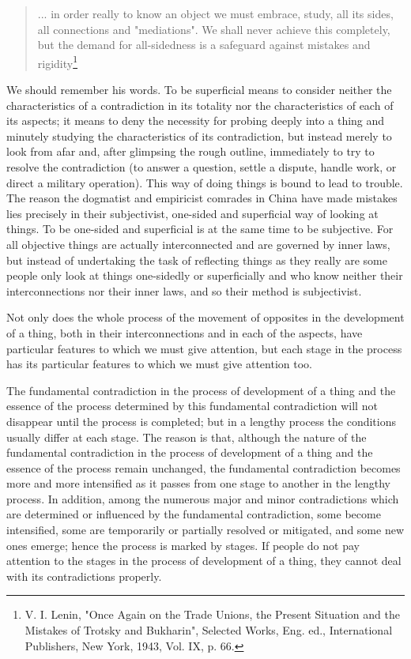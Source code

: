 \documentclass{article}
\begin{document}
\begin{quote}
... in order really to know an object we must embrace, study, all its sides,
all connections and "mediations". We shall never achieve this completely, but
the demand for all-sidedness is a safeguard against mistakes and
rigidity\footnote{V. I. Lenin, "Once Again on the Trade Unions, the Present
Situation and the Mistakes of Trotsky and Bukharin", Selected Works, Eng. ed.,
International Publishers, New York, 1943, Vol. IX, p. 66.}
\end{quote}

We should remember his words. To be superficial means to consider neither the
characteristics of a contradiction in its totality nor the characteristics of
each of its aspects; it means to deny the necessity for probing deeply into
a thing and minutely studying the characteristics of its contradiction, but
instead merely to look from afar and, after glimpsing the rough outline,
immediately to try to resolve the contradiction (to answer a question, settle
a dispute, handle work, or direct a military operation). This way of doing
things is bound to lead to trouble. The reason the dogmatist and empiricist
comrades in China have made mistakes lies precisely in their subjectivist,
one-sided and superficial way of looking at things. To be one-sided and
superficial is at the same time to be subjective. For all objective things are
actually interconnected and are governed by inner laws, but instead of
undertaking the task of reflecting things as they really are some people only
look at things one-sidedly or superficially and who know neither their
interconnections nor their inner laws, and so their method is subjectivist.

Not only does the whole process of the movement of opposites in the development
of a thing, both in their interconnections and in each of the aspects, have
particular features to which we must give attention, but each stage in the
process has its particular features to which we must give attention too.

The fundamental contradiction in the process of development of a thing and the
essence of the process determined by this fundamental contradiction will not
disappear until the process is completed; but in a lengthy process the
conditions usually differ at each stage. The reason is that, although the
nature of the fundamental contradiction in the process of development of
a thing and the essence of the process remain unchanged, the fundamental
contradiction becomes more and more intensified as it passes from one stage to
another in the lengthy process. In addition, among the numerous major and minor
contradictions which are determined or influenced by the fundamental
contradiction, some become intensified, some are temporarily or partially
resolved or mitigated, and some new ones emerge; hence the process is marked by
stages. If people do not pay attention to the stages in the process of
development of a thing, they cannot deal with its contradictions properly.
\end{document}

